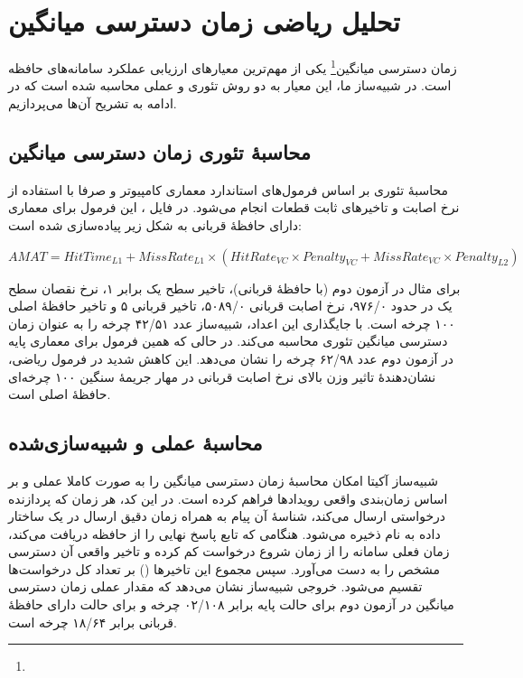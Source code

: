 \section{تحلیل ریاضی زمان دسترسی میانگین}

زمان دسترسی میانگین\footnote{} یکی از مهم‌ترین معیارهای ارزیابی عملکرد سامانه‌های حافظه است. در شبیه‌ساز ما، این معیار به دو روش تئوری و عملی محاسبه شده است که در ادامه به تشریح آن‌ها می‌پردازیم.

\subsection{محاسبهٔ تئوری زمان دسترسی میانگین}
محاسبهٔ تئوری بر اساس فرمول‌های استاندارد معماری کامپیوتر و صرفا با استفاده از نرخ اصابت و تاخیرهای ثابت قطعات انجام می‌شود. در فایل ، این فرمول برای معماری دارای حافظهٔ قربانی به شکل زیر پیاده‌سازی شده است\cite{wikipediaAMAT}:

$AMAT = HitTime_{L1} + MissRate_{L1} \times (HitRate_{VC} \times Penalty_{VC} + MissRate_{VC} \times Penalty_{L2})$

برای مثال در آزمون دوم (با حافظهٔ قربانی)، تاخیر سطح یک برابر ۱، نرخ نقصان سطح یک در حدود ۹۷۶/۰، نرخ اصابت قربانی ۵۰۸۹/۰، تاخیر قربانی ۵ و تاخیر حافظهٔ اصلی ۱۰۰ چرخه است. با جایگذاری این اعداد، شبیه‌ساز عدد ۴۲/۵۱ چرخه را به عنوان زمان دسترسی میانگین تئوری محاسبه می‌کند. در حالی که همین فرمول برای معماری پایه در آزمون دوم عدد ۶۲/۹۸ چرخه را نشان می‌دهد. این کاهش شدید در فرمول ریاضی، نشان‌دهندهٔ تاثیر وزن بالای نرخ اصابت قربانی در مهار جریمهٔ سنگین ۱۰۰ چرخه‌ای حافظهٔ اصلی است.

\subsection{محاسبهٔ عملی و شبیه‌سازی‌شده}
شبیه‌ساز آکیتا امکان محاسبهٔ زمان دسترسی میانگین را به صورت کاملا عملی و بر اساس زمان‌بندی واقعی رویدادها فراهم کرده است. در این کد، هر زمان که پردازنده درخواستی ارسال می‌کند، شناسهٔ آن پیام به همراه زمان دقیق ارسال در یک ساختار داده به نام  ذخیره می‌شود. 
هنگامی که تابع  پاسخ نهایی را از حافظه دریافت می‌کند، زمان فعلی سامانه را از زمان شروع درخواست کم کرده و تاخیر واقعی آن دسترسی مشخص را به دست می‌آورد. سپس مجموع این تاخیرها () بر تعداد کل درخواست‌ها تقسیم می‌شود. خروجی شبیه‌ساز نشان می‌دهد که مقدار عملی زمان دسترسی میانگین در آزمون دوم برای حالت پایه برابر ۰۲/۱۰۸ چرخه و برای حالت دارای حافظهٔ قربانی برابر ۱۸/۶۴ چرخه است.

